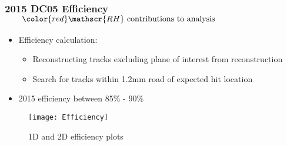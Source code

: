 \begin{frame}%
  \frametitle{2015 DC05 Efficiency $\qquad \color{red} \mathscr{RH} \text{ contributions to analysis}$}

  \begin{itemize}
  \item Efficiency calculation:
    \begin{itemize}
    \item Reconstructing tracks excluding plane of interest from
      reconstruction
    \item Search for tracks within 1.2mm road of expected hit
      location
    \end{itemize}
  \item 2015 efficiency between 85$\%$ - 90$\%$
  \end{itemize}
  
  \begin{figure}
    \centering
    \texttt{[image: Efficiency]}
    \caption{1D and 2D efficiency plots}
  \end{figure}
\end{frame}



